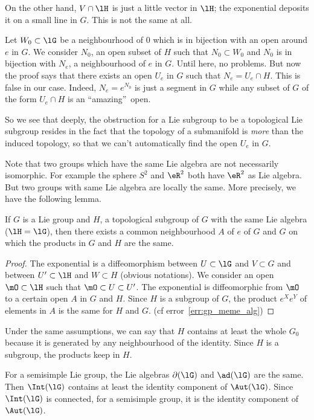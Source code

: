 On the other hand, $V\cap\lH$ is just a little vector in $\lH$; the exponential deposits it on a small line in $G$. This is not the same at all.

Let $W_0\subset\lG$  be a neighbourhood of $0$ which is in bijection with an open around $e$ in $G$. We consider $N_0$, an open subset of $H$ such that $N_0\subset W_0$ and $N_0$ is in bijection with $N_e$, a neighbourhood of $e$ in $G$. Until here, no problems. But now the proof says that there exists an open $U_e$ in $G$ such that $N_e=U_e\cap H$. This is false in our case. Indeed, $N_e=e^{N_0}$ is just a segment in $G$ while any subset of $G$ of the form $U_e\cap H$ is an ``amazing''\ open.

So we see that deeply, the obstruction for a Lie subgroup to be a topological Lie subgroup resides in the fact that the topology of a submanifold is \emph{more} than the induced topology, so that we can't automatically find the open $U_e$ in $G$.


Note that two groups which have the same Lie algebra are not necessarily isomorphic. For example the sphere $S^2$ and $\eR^2$ both have $\eR^2$ as Lie algebra. But two groups with same Lie algebra are locally the same. More precisely, we have the following lemma.

\begin{lemma}
	If $G$ is a Lie group and $H$, a topological subgroup of $G$ with the same Lie algebra ($\lH=\lG$), then there exists a common neighbourhood $A$ of $e$ of $G$ and $G$ on which the products in $G$ and $H$ are the same.
\end{lemma}

\begin{proof}
	The exponential is a diffeomorphism between $U\subset\lG$ and $V\subset G$ and between $U'\subset\lH$ and $W\subset H$ (obvious notations). We consider an open $\mO\subset\lH$ such that $\mO\subset U\subset U'$. The exponential is diffeomorphic from $\mO$ to a certain open $A$ in $G$ and $H$. Since $H$ is a subgroup of $G$, the product $e^Xe^Y$ of elements in $A$ is the same for $H$ and $G$. (cf error~\ref{err:gp_meme_alg})
\end{proof}

Under the same assumptions, we can say that $H$ contains at least the whole $G_0$ because it is generated by any neighbourhood of the identity. Since $H$ is a subgroup, the products keep in $H$.

For a semisimple Lie group, the Lie algebras $\partial(\lG)$ and $\ad(\lG)$ are the same. Then $\Int(\lG)$ contains at least the identity component of $\Aut(\lG)$. Since $\Int(\lG)$ is connected, for a semisimple group, it is the identity component of $\Aut(\lG)$.

